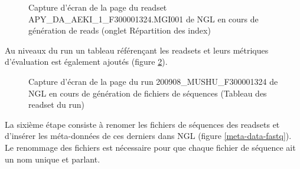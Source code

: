 \begin{figure}[H]
    \centering
    \caption{\footnotesize{Capture d'écran de la page du readset APY\_DA\_AEKI\_1\_F300001324.MGI001 de NGL en cours de génération de reads (onglet \og Répartition des index\fg{})}}
    \label{NGL-screenshot_readset-index}
\end{figure}

Au niveaux du run un tableau référençant les readsets et leurs métriques d'évaluation est également ajoutés (figure \ref{NGL-screenshot_tab-run-readset}).

\begin{figure}[H]
    \centering
    \caption{\footnotesize{Capture d'écran de la page du run 200908\_MUSHU\_F300001324 de NGL en cours de génération de fichiers de séquences (Tableau des readset du run)}}
    \label{NGL-screenshot_tab-run-readset}
\end{figure}

La sixième étape consiste à renomer les fichiers de séquences des readsets et d'insérer les méta-données de ces derniers dans NGL (figure \ref{meta-data-fastq}).
Le renommage des fichiers est nécessaire pour que chaque fichier de séquence ait un nom unique et \og parlant\fg{}.\\

